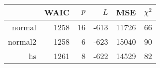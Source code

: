\begin{tabular}{rrrrrr}
  \hline
 & WAIC & $p$ & $L$ & MSE & $\chi^2$ \\ 
  \hline
normal & 1258 & 16 & -613 & 11726 & 66 \\ 
  normal2 & 1258 & 6 & -623 & 15040 & 90 \\ 
  hs & 1261 & 8 & -622 & 14529 & 82 \\ 
   \hline
\end{tabular}
